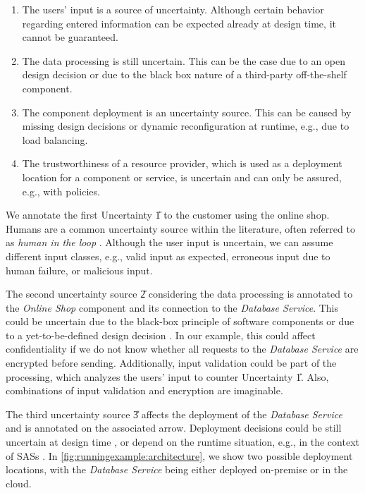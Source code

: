\begin{enumerate}[label=\textbf{U\arabic*}]
    \item The users' input is a source of uncertainty. Although certain behavior regarding entered information can be expected already at design time, it cannot be guaranteed. %
    \item The data processing is still uncertain. This can be the case due to an open design decision or due to the black box nature of a third-party off-the-shelf component. %
    \item The component deployment is an uncertainty source. This can be caused by missing design decisions or dynamic reconfiguration at runtime, e.g., due to load balancing. %
    \item The trustworthiness of a resource provider, which is used as a deployment location for a component or service, is uncertain and can only be assured, e.g., with policies. %
\end{enumerate}

We annotate the first Uncertainty \U{1} to the customer using the online shop.
Humans are a common uncertainty source within the literature, often referred to as \emph{human in the loop} \cite{perez-palacin_uncertainties_2014,ramirez_taxonomy_2012}.
Although the user input is uncertain, we can assume different input classes, e.g., valid input as expected, erroneous input due to human failure, or malicious input.

The second uncertainty source \U{2} considering the data processing is annotated to the \emph{Online Shop} component and its connection to the \emph{Database Service}.
This could be uncertain due to the black-box principle of software components \cite{reussner_modeling_2016} or due to a yet-to-be-defined design decision \cite{lytra_supporting_2013}.
In our example, this could affect confidentiality if we do not know whether all requests to the \emph{Database Service} are encrypted before sending.
Additionally, input validation could be part of the processing, which analyzes the users' input to counter Uncertainty \U{1}.
Also, combinations of input validation and encryption are imaginable.

The third uncertainty source \U{3} affects the deployment of the \emph{Database Service} and is annotated on the associated arrow.
Deployment decisions could be still uncertain at design time \cite{mcconnell_software_1998}, or depend on the runtime situation, e.g., in the context of \acfp{SAS} \cite{weyns_introduction_2020}.
In \autoref{fig:runningexample:architecture}, we show two possible deployment locations, with the \emph{Database Service} being either deployed on-premise or in the cloud.

